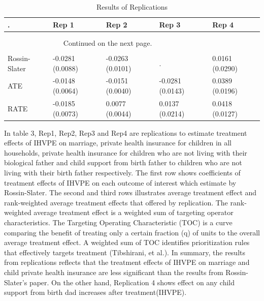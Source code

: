 \documentclass[11pt,a4paper]{article}
\begin{document}
\begin{longtable}{l|l|l|l|l{6cm}}
\caption{Results of Replications} \\
\hline
\textbf{.} & \textbf{Rep 1}& \textbf{Rep 2} & \textbf{Rep 3}  & \textbf{Rep 4}   \\
\hline
\endfirsthead %
\caption{Results of Replications (continued)}\\
\hline
\caption{Results of Replications} \\
\hline
\endhead %
\multicolumn{3}{r}{Continued on the next page.}\\
\endfoot
\hline
\multicolumn{3}{r}{End of table.} \\
\endlastfoot
Rossin-Slater & -0.0281 (0.0088) & -0.0263 (0.0101) & . & 0.0161 (0.0290)\\
ATE & -0.0148 (0.0064) & -0.0151 (0.0040) & -0.0281 (0.0143) & 0.0389 (0.0196)\\
RATE & -0.0185 (0.0073) & 0.0077 (0.0044) & 0.0137 (0.0214) & 0.0418 (0.0127)\\
\bottomrule()
\end{longtable}

In table 3, Rep1, Rep2, Rep3 and Rep4 are replications to estimate treatment effects of IHVPE on marriage, private health insurance for children in all households, private health insurance for children who are not living with their biological father and child support from birth father to children who are not living with their birth father respectively. The first row shows coefficients of treatment effects of IHVPE on each outcome of interest which estimate by Rossin-Slater. The second and third rows illustrates average treatment effect and rank-weighted average treatment effects that offered by replication. The rank-weighted average treatment effect is a weighted sum of targeting operator characteristics. The Targeting Operating Characteristic (TOC) is a curve comparing the benefit of treating only a certain fraction (q) of units to the overall average treatment effect. A weighted sum of TOC identifies prioritization rules that effectively targets treatment (Tibshirani, et al.).
In summary, the results from replications reflects that the treatment effects of IHVPE on marriage and child private health insurance are less significant than the results from Rossin-Slater's paper. On the other hand, Replication 4 shows effect on any child support from birth dad increases after treatment(IHVPE).
\end{document}
